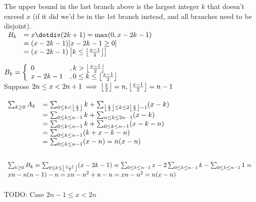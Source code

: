 \documentclass[10pt]{article}
\begin{document}
The upper bound in the last branch above is the largest integer $k$ that doesn't exceed $x$ (if it did we'd be in the 1st branch instead, and all branches need to be disjoint).\\

$
\begin{array}{ll}
B_k & = \monus{x}{(2k+1)} = \max(0,x-2k-1) \\
    & = (x-2k-1)[x-2k-1\geq 0] \\
    & = (x-2k-1) \left[k \leq \floor{\frac{x-1}{2} } \right]\\
\end{array}
$

$
B_k = 
\left\{
\begin{array}{ll}
	0 & , k > \left\lfloor {\frac{x-1}{2} } \right\rfloor \\
	x-2k-1 & , 0 \leq k \leq \left\lfloor {\frac{x-1}{2} } \right\rfloor  \\
\end{array}
\right.
$\\


Suppose $2n\leq x < 2n+1 \implies \left\lfloor {\frac{x}{2}} \right\rfloor = n , \left\lfloor {\frac{x-1}{2}} \right\rfloor = n-1$\\

$
\begin{array}{ll}\\
\sum_{k\geq 0} A_k & = \sum_{0\leq k < \left\lfloor {\frac{x}{2}} \right\rfloor} k +  \sum_{\left\lfloor {\frac{x}{2}} \right\rfloor \leq k \leq 2\left\lfloor {\frac{x}{2}} \right\rfloor - 1} (x-k) \\
& = \sum_{0\leq k \leq n-1} k +  \sum_{n \leq k \leq 2n - 1} (x-k) \\
& = \sum_{0\leq k \leq n-1} k +  \sum_{0 \leq k \leq n-1} (x-k-n) \\
& = \sum_{0\leq k \leq n-1} (k + x - k - n) \\
& = \sum_{0\leq k \leq n-1} (x - n) = n(x-n)\\
\end{array}
$

$
\begin{array}{l}\\
\sum_{k\geq 0} B_k = \sum_{0 \leq k \leq \left\lfloor {\frac{x-1}{2}} \right\rfloor} (x-2k-1) = \sum_{0 \leq k \leq n-1} x  -2\sum_{0 \leq k \leq n-1} k - \sum_{0 \leq k \leq n-1} 1 = \\
xn -n(n-1)-n = xn-n^2 + n -n = xn-n^2=n(x-n)
\end{array}
$
\\\\
TODO: Case $2n-1\leq x < 2n$
\end{document}
